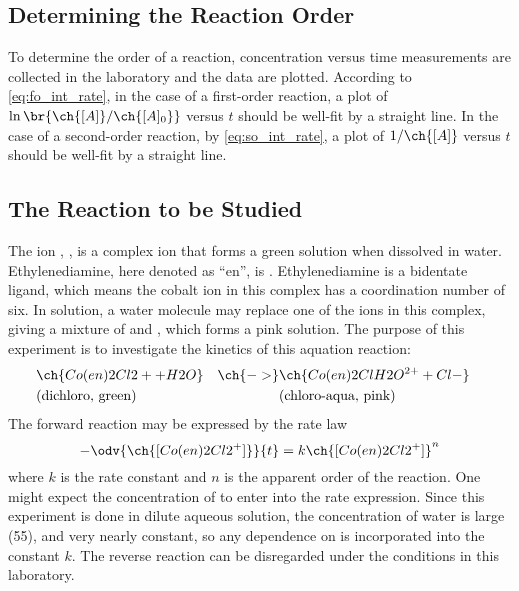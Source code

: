 \subsection{Determining the Reaction Order}
\label{subs:determining_reaction_order}

To determine the order of a reaction, concentration versus time measurements are collected in the laboratory and the data are plotted. 
According to \cref{eq:fo_int_rate}, in the case of a first-order reaction, a plot of \(\ln\br{\ch{[A]}/\ch{[A]_0}}\) versus \(t\) should be well-fit by a straight line. 
In the case of a second-order reaction, by \cref{eq:so_int_rate},  a plot of \(1/\ch{[A]}\) versus \(t\) should be well-fit by a straight line. 

\subsection{The Reaction to be Studied}
\label{subs:reaction_to_be_studied}

The ion , , is a complex ion that forms a green solution when dissolved in water. 
Ethylenediamine, here denoted as ``en'', is . Ethylenediamine is a bidentate ligand, which means the cobalt ion in this complex has a coordination number of six. 
In solution, a water molecule may replace one of the  ions in this complex, giving a mixture of \iupac{\cis-} and \iupac{\trans-}, which forms a pink solution. 
The purpose of this experiment is to investigate the kinetics of this aquation reaction:
\begin{equation}
	\begin{aligned}[t]
	&\ch{Co(en)2Cl2+ + H2O} 	&\ch{->}	& \ch{Co(en)2ClH2O^{2+} + Cl-}& \\
	&\text{(dichloro, green)}	&			& \text{(chloro-aqua, pink)}&
	\end{aligned}
	\label{rxn:cis-trans_cobalt}
\end{equation} 
The forward reaction may be expressed by the rate law
\begin{equation}
	- \odv{\ch{[Co(en)2Cl2^+]}}{t} = k \ch{[Co(en)2Cl2^+]}^n
	\label{eq:Co_rate_law}
\end{equation}
where \(k\) is the rate constant and \(n\) is the apparent order of the reaction. 
One might expect the concentration of  to enter into the rate expression. 
Since this experiment is done in dilute aqueous solution, the concentration of water is large (\qty{55}{\Molar}), and very nearly constant, so any dependence on \ch{[H2O]} is incorporated into the constant \(k\). 
The reverse reaction can be disregarded under the conditions in this laboratory. 

